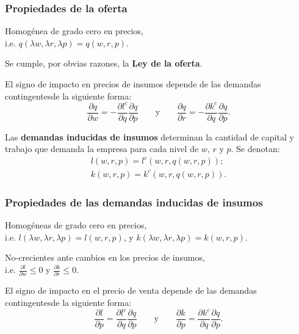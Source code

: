 \documentclass[8pt,a4paper]{extarticle}
\begin{document}
\begin{multicols}{3}
	\subsubsection{Propiedades de la oferta}

	\begin{eqlist}
		\item Homogénea de grado cero en precios, \\ i.e. $q(\lambda w, \lambda r, \lambda p) = q(w, r, p)$.
		\item Se cumple, por obvias razones, la \textbf{Ley de la oferta}.
		\item El signo de impacto en precios de insumos depende de las demandas contingentesde la siguiente forma:
		\[
			\frac{\partial q}{\partial w} = - \frac{\partial l^c}{\partial q} \frac{\partial q}{\partial p} \qquad \text{y} \qquad \frac{\partial q}{\partial r} = - \frac{\partial k^c}{\partial q} \frac{\partial q}{\partial p}
			.\]
	\end{eqlist}

	\begin{boxdef}
		Las \textbf{demandas inducidas de insumos} determinan la cantidad de capital y trabajo que demanda la empresa para cada nivel de $w$, $r$ y $p$. Se denotan:
		\begin{gather*}
			l(w,r,p) = l^c (w, r, q(w, r, p)); \\
			k(w, r, p) = k^c(w, r, q(w, r, p))
			.\end{gather*}
	\end{boxdef}

	\sectionbreak

	\subsubsection{Propiedades de las demandas inducidas de insumos}

	\begin{eqlist}
		\item Homogéneas de grado cero en precios,\\ i.e. $l(\lambda w, \lambda r, \lambda p) = l(w, r, p)$, y $k(\lambda w, \lambda r, \lambda p) = k(w, r, p)$.
		\item No-crecientes ante cambios en los precios de insumos, \\ i.e. $\displaystyle \frac{\partial l}{\partial w} \le 0$ y $\displaystyle \frac{\partial k}{\partial r} \le 0$.
		\item El signo de impacto en el precio de venta depende de las demandas contingentesde la siguiente forma:
		\[
			\frac{\partial l}{\partial p} = \frac{\partial l^c}{\partial q} \frac{\partial q}{\partial p} \qquad \text{y} \qquad \frac{\partial k}{\partial p} = \frac{\partial k^c}{\partial q} \frac{\partial q}{\partial p}
			.\]
	\end{eqlist}


\end{multicols}
\end{document}
